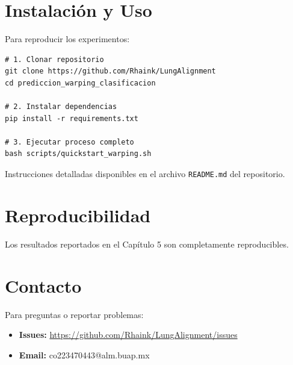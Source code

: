 \section{Instalación y Uso}

Para reproducir los experimentos:

\begin{verbatim}
# 1. Clonar repositorio
git clone https://github.com/Rhaink/LungAlignment
cd prediccion_warping_clasificacion

# 2. Instalar dependencias
pip install -r requirements.txt

# 3. Ejecutar proceso completo
bash scripts/quickstart_warping.sh
\end{verbatim}

Instrucciones detalladas disponibles en el archivo \texttt{README.md} del repositorio.

\section{Reproducibilidad}

Los resultados reportados en el Capítulo 5 son completamente reproducibles.

\section{Contacto}

Para preguntas o reportar problemas:

\begin{itemize}
    \item \textbf{Issues:} \url{https://github.com/Rhaink/LungAlignment/issues}
    \item \textbf{Email:} co223470443@alm.buap.mx
\end{itemize}
